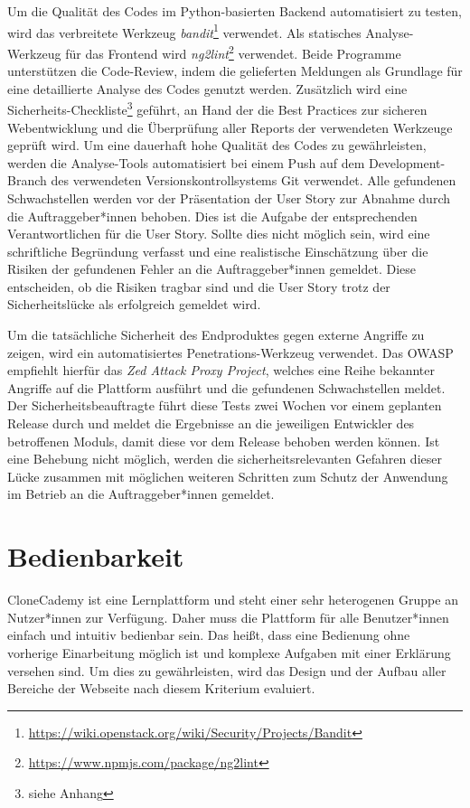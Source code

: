 Um die Qualität des Codes im Python-basierten Backend automatisiert zu testen, wird das verbreitete Werkzeug \emph{bandit}\footnote{\href{https://wiki.openstack.org/wiki/Security/Projects/Bandit}{https://wiki.openstack.org/wiki/Security/Projects/Bandit}} verwendet. Als statisches Analyse-Werkzeug für das Frontend wird \emph{ng2lint}\footnote{\href{https://www.npmjs.com/package/ng2lint}{https://www.npmjs.com/package/ng2lint}} verwendet. Beide Programme unterstützen die Code-Review, indem die gelieferten Meldungen als Grundlage für eine detaillierte Analyse des Codes genutzt werden. Zusätzlich wird eine Sicherheits-Checkliste\footnote{siehe Anhang} geführt, an Hand der die Best Practices zur sicheren Webentwicklung und die Überprüfung aller Reports der verwendeten Werkzeuge geprüft wird. Um eine dauerhaft hohe Qualität des Codes zu gewährleisten, werden die Analyse-Tools automatisiert bei einem Push auf dem Development-Branch des verwendeten Versionskontrollsystems Git verwendet. Alle gefundenen Schwachstellen werden vor der Präsentation der User Story zur Abnahme durch die Auftraggeber*innen behoben. Dies ist die Aufgabe der entsprechenden Verantwortlichen für die User Story. Sollte dies nicht möglich sein, wird eine schriftliche Begründung verfasst und eine realistische Einschätzung über die Risiken der gefundenen Fehler an die Auftraggeber*innen gemeldet. Diese entscheiden, ob die Risiken tragbar sind und die User Story trotz der Sicherheitslücke als erfolgreich gemeldet wird.

Um die tatsächliche Sicherheit des Endproduktes gegen externe Angriffe zu zeigen, wird ein automatisiertes Penetrations-Werkzeug verwendet. Das OWASP empfiehlt hierfür das \emph{Zed Attack Proxy Project}, welches eine Reihe bekannter Angriffe auf die Plattform ausführt und die gefundenen Schwachstellen meldet. Der Sicherheitsbeauftragte führt diese Tests zwei Wochen vor einem geplanten Release durch und meldet die Ergebnisse an die jeweiligen Entwickler des betroffenen Moduls, damit diese vor dem Release behoben werden können. Ist eine Behebung nicht möglich, werden die sicherheitsrelevanten Gefahren dieser Lücke zusammen mit möglichen weiteren Schritten zum Schutz der Anwendung im Betrieb an die Auftraggeber*innen gemeldet.


\section{Bedienbarkeit}
CloneCademy ist eine Lernplattform und steht einer sehr heterogenen Gruppe an Nutzer*innen zur Verfügung. Daher muss die Plattform für alle Benutzer*innen einfach und intuitiv bedienbar sein. Das heißt, dass eine Bedienung ohne vorherige Einarbeitung möglich ist und komplexe Aufgaben mit einer Erklärung versehen sind. Um dies zu gewährleisten, wird das Design und der Aufbau aller Bereiche der Webseite nach diesem Kriterium evaluiert.

